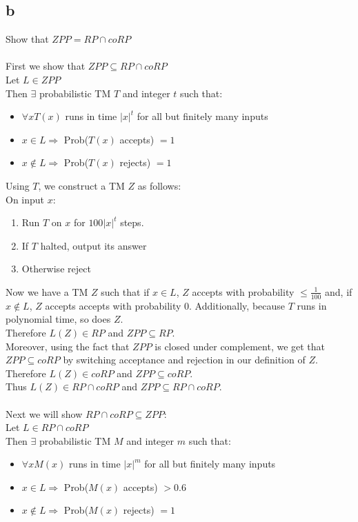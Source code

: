 \documentclass[letterpaper,notitlepage,twoside]{article}
\begin{document}
\subsection*{b}
Show that $ZPP = RP \cap coRP$ \\ \\
First we show that $ZPP \subseteq RP \cap coRP$ \\
Let $L \in ZPP$ \\
Then $\exists$ probabilistic TM $T$ and integer $t$ such that:
\begin{itemize}
  \item $\forall x T(x)$ runs in time $|x|^{t}$ for all but finitely many inputs
  \item $x \in L \Rightarrow$ Prob($T(x)$ accepts) $=1$
  \item $x \notin L \Rightarrow$ Prob($T(x)$ rejects) $=1$
\end{itemize}
Using $T$, we construct a TM $Z$ as follows: \\
On input $x$:
\begin{enumerate}
  \item Run $T$ on $x$ for $100|x|^{t}$ steps.
  \item If $T$ halted, output its answer
  \item Otherwise reject
\end{enumerate}
Now we have a TM $Z$ such that if $x \in L$, $Z$ accepts with probability $\leq \frac{1}{100}$ and, if $x \notin L$, $Z$ accepts accepts with probability 0. Additionally, because $T$ runs in polynomial time, so does $Z$. \\
Therefore $L(Z) \in RP$ and $ZPP \subseteq RP$. \\ 
Moreover, using the fact that $ZPP$ is closed under complement, we get that $ZPP \subseteq coRP$ by switching acceptance and rejection in our definition of $Z$. \\
Therefore $L(Z) \in coRP$ and $ZPP \subseteq coRP$. \\
Thus $L(Z) \in RP \cap coRP$ and $ZPP \subseteq RP \cap coRP$.
\\ \\
Next we will show $RP \cap coRP \subseteq ZPP$: \\
Let $L \in RP \cap coRP$ \\
Then $\exists$ probabilistic TM $M$ and integer $m$ such that:
\begin{itemize}
  \item $\forall x M(x)$ runs in time $|x|^{m}$ for all but finitely many inputs
  \item $x \in L \Rightarrow$ Prob($M(x)$ accepts) $> 0.6$
  \item $x \notin L \Rightarrow$ Prob($M(x)$ rejects) $=1$
\end{itemize}
\end{document}
